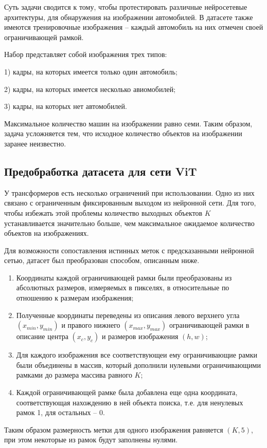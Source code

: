 \documentclass[14pt,a4paper]{extarticle}
\begin{document}
Суть задачи сводится к тому, чтобы протестировать различные нейросетевые архитектуры, для обнаружения на изображении автомобилей. В датасете также имеются тренировочные изображения -- каждый автомобиль на них отмечен своей ограничивающей рамкой. 

Набор представляет собой изображения трех типов:

1) кадры, на которых имеется только один автомобиль;

2) кадры, на которых имеется несколько авиомобилей;

3) кадры, на которых нет автомобилей.


Максимальное количество машин на изображении равно семи. Таким образом, задача усложняется тем, что исходное количество объектов на изображении заранее неизвестно.
\newpage
\subsection{Предобработка датасета для сети ViT}

У трансформеров есть несколько ограничений при использовании. Одно из них связано с ограниченным фиксированным выходом из нейронной сети. Для того, чтобы избежать этой проблемы количество выходных объектов $K$ устанавливается значительно больше, чем максимальное ожидаемое количество объектов на изображениях. 

Для возможности сопоставления истинных меток с предсказанными нейронной сетью, датасет был преобразован способом, описанным ниже.
\begin{enumerate}
\item Координаты каждой ограничивающей рамки были преобразованы из абсолютных размеров, измеряемых в пикселях, в относительные по отношению к размерам изображения;
\item Полученные координаты переведены из описания левого верхнего угла $(x_{min}, y_{min})$ и правого нижнего $(x_{max}, y_{max})$ ограничивающей рамки в описание центра $(x_{c}, y_{c})$ и размеров изображения $(h, w)$;
\item Для каждого изображения все соответствующеи ему ограничивающие рамки были объединены в массив, который дополнили нулевыми ограничивающими рамками до размера массива равного $K$;
\item Каждой ограничивающей рамке была добавлена еще одна координата, соответствующая нахождению в ней объекта поиска, т.е. для ненулевых рамок 1, для остальных -- 0.
\end{enumerate}
Таким образом размерность метки для одного изображения равняется $(K, 5)$, при этом некоторые из рамок будут заполнены нулями.
\newpage
\end{document}
